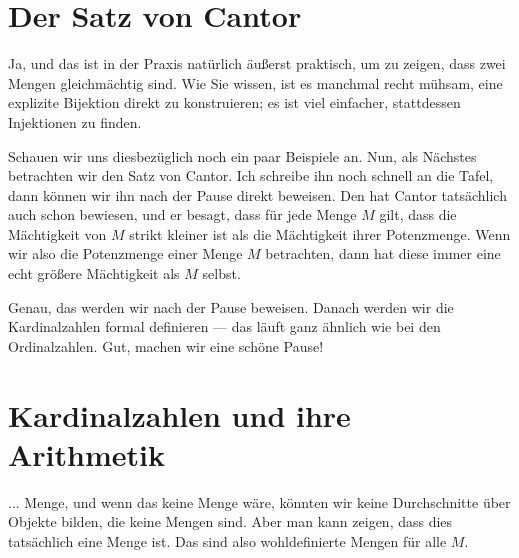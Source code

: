 \section{Der Satz von Cantor}

\begin{spoken-clean}[00:40:36 - 00:42:42]
Ja, und das ist in der Praxis natürlich äußerst praktisch, um zu zeigen, dass zwei Mengen gleichmächtig sind. Wie Sie wissen, ist es manchmal recht mühsam, eine explizite Bijektion direkt zu konstruieren; es ist viel einfacher, stattdessen Injektionen zu finden.

Schauen wir uns diesbezüglich noch ein paar Beispiele an. Nun, als Nächstes betrachten wir den Satz von Cantor. Ich schreibe ihn noch schnell an die Tafel, dann können wir ihn nach der Pause direkt beweisen. Den hat Cantor tatsächlich auch schon bewiesen, und er besagt, dass für jede Menge $M$ gilt, dass die Mächtigkeit von $M$ strikt kleiner ist als die Mächtigkeit ihrer Potenzmenge. Wenn wir also die Potenzmenge einer Menge $M$ betrachten, dann hat diese immer eine echt größere Mächtigkeit als $M$ selbst.

Genau, das werden wir nach der Pause beweisen. Danach werden wir die Kardinalzahlen formal definieren --- das läuft ganz ähnlich wie bei den Ordinalzahlen. Gut, machen wir eine schöne Pause!
\end{spoken-clean}

\begin{math-stroke}
\end{math-stroke}

\begin{lecture-break}
\end{lecture-break}

\section{Kardinalzahlen und ihre Arithmetik}

\begin{spoken-clean}[00:54:02 - 00:54:37]
... Menge, und wenn das keine Menge wäre, könnten wir keine Durchschnitte über Objekte bilden, die keine Mengen sind. Aber man kann zeigen, dass dies tatsächlich eine Menge ist. Das sind also wohldefinierte Mengen für alle $M$.
\end{spoken-clean}

